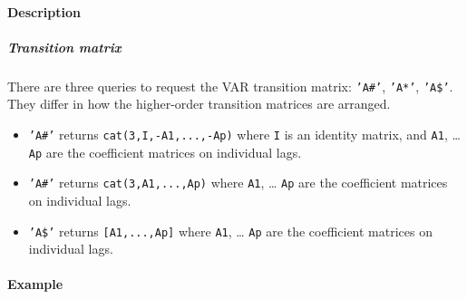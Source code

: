  \paragraph{Description}
 
 \subparagraph{Transition matrix}
 
 There are three queries to request the VAR transition matrix:
 \texttt{'A\#'}, \texttt{'A*'}, \texttt{'A\$'}. They differ in how the
 higher-order transition matrices are arranged.
 
 \begin{itemize}
 \item
   \texttt{'A\#'} returns \texttt{cat(3,I,-A1,...,-Ap)} where \texttt{I}
   is an identity matrix, and \texttt{A1}, \ldots{} \texttt{Ap} are the
   coefficient matrices on individual lags.
 \item
   \texttt{'A\#'} returns \texttt{cat(3,A1,...,Ap)} where \texttt{A1},
   \ldots{} \texttt{Ap} are the coefficient matrices on individual lags.
 \item
   \texttt{'A\$'} returns \texttt{{[}A1,...,Ap{]}} where \texttt{A1},
   \ldots{} \texttt{Ap} are the coefficient matrices on individual lags.
 \end{itemize}
 
 \paragraph{Example}


